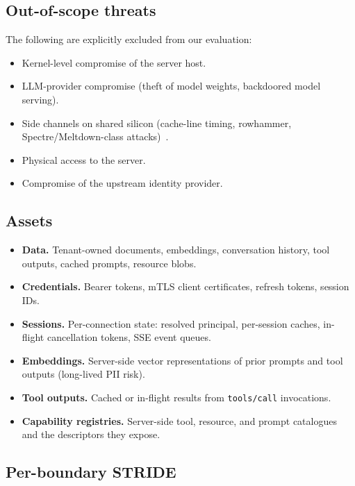 \subsection{Out-of-scope threats}

The following are explicitly excluded from our evaluation:

\begin{itemize}
  \item Kernel-level compromise of the server host.
  \item LLM-provider compromise (theft of model weights,
        backdoored model serving).
  \item Side channels on shared silicon (cache-line timing,
        rowhammer, Spectre/Meltdown-class attacks)~\cite{dipta_2024_sandbox}.
  \item Physical access to the server.
  \item Compromise of the upstream identity provider.
\end{itemize}

\subsection{Assets}

\begin{itemize}
  \item \textbf{Data.} Tenant-owned documents, embeddings,
        conversation history, tool outputs, cached prompts,
        resource blobs.
  \item \textbf{Credentials.} Bearer tokens, mTLS client
        certificates, refresh tokens, session IDs.
  \item \textbf{Sessions.} Per-connection state: resolved
        principal, per-session caches, in-flight cancellation
        tokens, SSE event queues.
  \item \textbf{Embeddings.} Server-side vector representations
        of prior prompts and tool outputs (long-lived PII risk).
  \item \textbf{Tool outputs.} Cached or in-flight results from
        \texttt{tools/call} invocations.
  \item \textbf{Capability registries.} Server-side tool,
        resource, and prompt catalogues and the descriptors they
        expose.
\end{itemize}

\subsection{Per-boundary STRIDE}\label{sec:taxonomy-tables}

